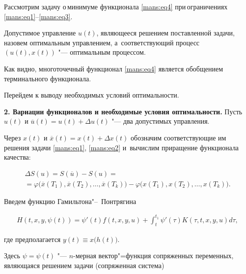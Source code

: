 Рассмотрим задачу о\,минимуме функционала \eqref{mans:eq4} при\,ограничениях\,\mbox{\eqref{mans:eq1}--\eqref{mans:eq3}.}



Допустимое управление  $ u(t) $, являющееся решением поставленной задачи, назовем оптимальным управлением, а~соответствующий процесс  $ (u(t), x(t)) $  "--- оптимальным процессом. 



Как видно, многоточечный функционал \eqref{mans:eq4} является обобщением терминального функционала.



Перейдем к выводу необходимых условий оптимальности.









\smallskip



\textbf{2. Вариации функционалов и необходимые условия оптимальности.} Пусть $ u(t) $  и $ \overline{u}(t)=u(t)+\Delta u(t) $  "--- два допустимых управления. 

Через $ x(t) $  и $ \overline{x}(t)=x(t)+\Delta x(t) $  обозначим соответствующие им решения задачи \eqref{mans:eq1}, \eqref{mans:eq2} и~вычислим приращение функционала качества:

\begin{multline}

\Delta S(u)=S(\overline{u})-S(u) = \\ 

=\varphi \bigl(\overline{x}(T_{1}), \overline{x}(T_{2}), \ldots, \overline{x}(T_{k})\bigr)-

\varphi \bigl(x(T_{1}), x(T_{2}), \ldots, x(T_{k}) \bigr) .

\label{mans:eq5}

\end{multline}



Введем функцию Гамильтона"--~Понтрягина

\begin{gather*}

H(t, x, y, \psi(t))=\psi'(t) f(t, x, y, u)+\int_{t}^{t_{1}} \psi'(\tau) K(\tau, t, x, y, u) d\tau , 

\end{gather*}

где предполагается $y(t)\equiv x\bigl(h(t)\bigr)$. 

Здесь $ \psi =\psi (t) $  "---  $ n $-мерная вектор"=функция сопряженных переменных, являющаяся решением задачи (сопряженная система)

